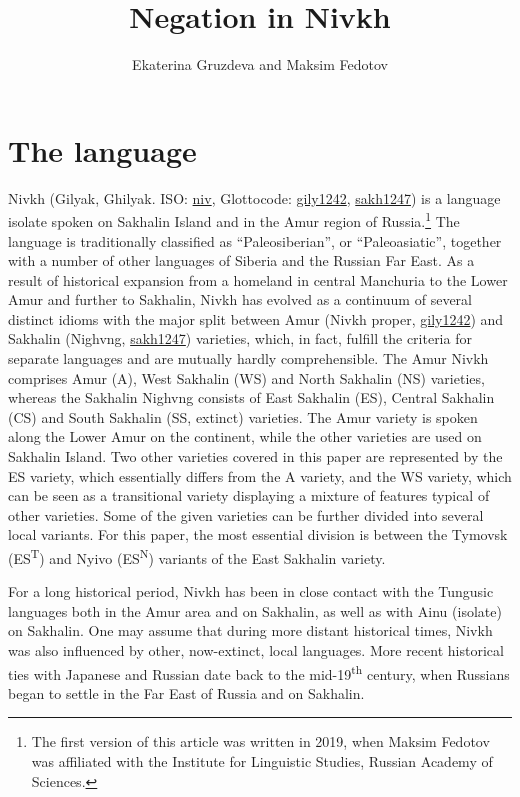 \documentclass[output=paper,colorlinks,citecolor=brown]{langscibook}
\author{Ekaterina Gruzdeva\affiliation{University of Helsinki} and Maksim Fedotov}
\title{Negation in Nivkh}
\begin{document}
\maketitle 

\section{The language}\label{sec:niv:1}

Nivkh (Gilyak, Ghilyak. ISO: \href{https://iso639-3.sil.org/code/niv}{niv}, Glottocode: \href{https://glottolog.org/resource/languoid/id/gily1242}{gily1242}, \href{https://glottolog.org/resource/languoid/id/sakh1247}{sakh1247}) is a language isolate spoken on Sakhalin Island and in the Amur region of Russia.\footnote{The first version of this article was written in 2019, when Maksim Fedotov was affiliated with the Institute for Linguistic Studies, Russian Academy of Sciences.} The language is traditionally classified as “Paleosiberian”, or “Paleoasiatic”, together with a number of other languages of Siberia and the Russian Far East. As a result of historical expansion from a homeland in central Manchuria to the Lower Amur and further to Sakhalin, Nivkh has evolved as a continuum of several distinct idioms with the major split between Amur (Nivkh proper, \href{https://glottolog.org/resource/languoid/id/gily1242}{gily1242}) and Sakhalin (Nighvng, \href{https://glottolog.org/resource/languoid/id/sakh1247}{sakh1247}) varieties, which, in fact, fulfill the criteria for separate languages and are mutually hardly comprehensible. 
The Amur Nivkh comprises Amur (A), West Sakhalin (WS) and North Sakhalin (NS) varieties, whereas the Sakhalin Nighvng consists of East Sakhalin (ES), Central Sakhalin (CS) and South Sakhalin (SS, extinct) varieties. The Amur variety is spoken along the Lower Amur on the continent, while the other varieties are used on Sakhalin Island. Two other varieties covered in this paper are represented by the ES variety, which essentially differs from the A variety, and the WS variety, which can be seen as a transitional variety displaying a mixture of features typical of other varieties. Some of the given varieties can be further divided into several local variants. For this paper, the most essential division is between the Tymovsk (ES\textsuperscript{T}) and Nyivo (ES\textsuperscript{N}) variants of the East Sakhalin variety.

For a long historical period, Nivkh has been in close contact with the Tungusic languages both in the Amur area and on Sakhalin, as well as with Ainu (isolate) on Sakhalin. One may assume that during more distant historical times, Nivkh was also influenced by other, now-extinct, local languages. More recent historical ties with Japanese and Russian date back to the mid-19\textsuperscript{th} century, when Russians began to settle in the Far East of Russia and on Sakhalin.
\end{document}
